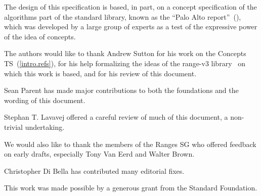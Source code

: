 
The design of this specification is based, in part, on a concept
specification of the algorithms part of the \Cpp standard library, known
as the ``Palo Alto report''~(\cite{palo-alto}), which was developed by a large
group of experts as a test of the expressive power of the idea of
concepts.

The authors would like to thank Andrew Sutton for his work on the Concepts TS~(\ref{intro.refs}),
for his help formalizing the ideas of the range-v3 library~\cite{range-v3} on which this
work is based, and for his review of this document.

Sean Parent has made major contributions to both the foundations and the wording of this
document.

Stephan T. Lavavej offered a careful review of much of this document, a non-trivial undertaking.

We would also like to thank the members of the Ranges SG who offered feedback on early drafts,
especially Tony Van Eerd and Walter Brown.

Christopher Di Bella has contributed many editorial fixes.

This work was made possible by a generous grant from the Standard \Cpp Foundation.
